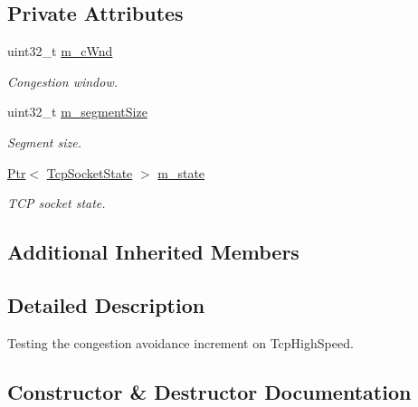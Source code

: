 \subsection*{Private Attributes}
\begin{DoxyCompactItemize}
\item 
uint32\+\_\+t \hyperlink{classTcpHighSpeedIncrementTest_a97d44cf5a9831a44e41e292241c71e1a}{m\+\_\+c\+Wnd}
\begin{DoxyCompactList}\small\item\em Congestion window. \end{DoxyCompactList}\item 
uint32\+\_\+t \hyperlink{classTcpHighSpeedIncrementTest_a2df13eec369c2568c2ede7a3a28f6214}{m\+\_\+segment\+Size}
\begin{DoxyCompactList}\small\item\em Segment size. \end{DoxyCompactList}\item 
\hyperlink{classns3_1_1Ptr}{Ptr}$<$ \hyperlink{classns3_1_1TcpSocketState}{Tcp\+Socket\+State} $>$ \hyperlink{classTcpHighSpeedIncrementTest_a05ee6e08927808018c90795bb93843f0}{m\+\_\+state}
\begin{DoxyCompactList}\small\item\em T\+CP socket state. \end{DoxyCompactList}\end{DoxyCompactItemize}
\subsection*{Additional Inherited Members}


\subsection{Detailed Description}
Testing the congestion avoidance increment on Tcp\+High\+Speed. 

\subsection{Constructor \& Destructor Documentation}
